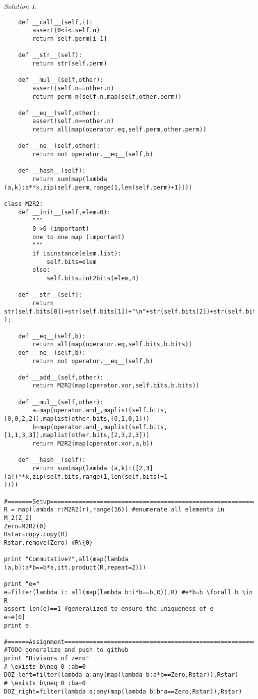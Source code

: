 \documentclass[a4paper,twoside=false,abstract=false,numbers=noenddot,
titlepage=false,headings=small,parskip=half,version=last]{scrartcl}
\theoremstyle{definition}
\theoremstyle{remark}
\newtheorem*{solution}{Solution}
\begin{document}
\begin{solution}
\begin{verbatim}
    def __call__(self,i):
        assert(0<i<=self.n)
        return self.perm[i-1] 

    def __str__(self):
        return str(self.perm)

    def __mul__(self,other):
        assert(self.n==other.n)
        return perm_n(self.n,map(self,other.perm))

    def __eq__(self,other):
        assert(self.n==other.n)
        return all(map(operator.eq,self.perm,other.perm))

    def __ne__(self,other):
        return not operator.__eq__(self,b)

    def __hash__(self):
        return sum(map(lambda (a,k):a**k,zip(self.perm,range(1,len(self.perm)+1))))

class M2R2:
    def __init__(self,elem=0):
        """
        0->0 (important)
        one to one map (important)
        """
        if isinstance(elem,list):
            self.bits=elem
        else:
            self.bits=int2bits(elem,4)

    def __str__(self):
        return str(self.bits[0])+str(self.bits[1])+"\n"+str(self.bits[2])+str(self.bits[3]
); 

    def __eq__(self,b):
        return all(map(operator.eq,self.bits,b.bits))
    def __ne__(self,b):
        return not operator.__eq__(self,b)

    def __add__(self,other):
        return M2R2(map(operator.xor,self.bits,b.bits))
    
    def __mul__(self,other):
        a=map(operator.and_,maplist(self.bits,[0,0,2,2]),maplist(other.bits,[0,1,0,1]))
        b=map(operator.and_,maplist(self.bits,[1,1,3,3]),maplist(other.bits,[2,3,2,3]))
        return M2R2(map(operator.xor,a,b))

    def __hash__(self):
        return sum(map(lambda (a,k):([2,3][a])**k,zip(self.bits,range(1,len(self.bits)+1
))))

#=======Setup===========================================================
R = map(lambda r:M2R2(r),range(16)) #enumerate all elements in M_2(Z_2)
Zero=M2R2(0)
Rstar=copy.copy(R)
Rstar.remove(Zero) #R\{0}

print "Commutative?",all(map(lambda (a,b):a*b==b*a,itt.product(R,repeat=2)))

print "e="
e=filter(lambda i: all(map(lambda b:i*b==b,R)),R) #e*b=b \forall b \in R
assert len(e)==1 #generalized to ensure the uniqueness of e
e=e[0]
print e

#======Assignment======================================================
#TODO generalize and push to github
print "Divisors of zero"
# \exists b\neq 0 :ab=0
DOZ_left=filter(lambda a:any(map(lambda b:a*b==Zero,Rstar)),Rstar)
# \exists b\neq 0 :ba=0 
DOZ_right=filter(lambda a:any(map(lambda b:b*a==Zero,Rstar)),Rstar) 


\end{verbatim}
\end{solution}
\end{document}
